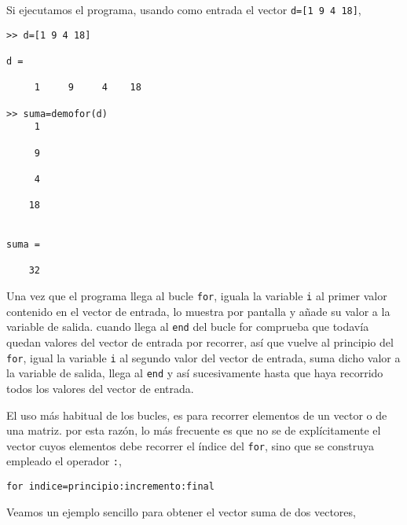 Si ejecutamos el programa, usando como entrada el vector \texttt{d=[1 9 4 18]},

\begin{verbatim}
>> d=[1 9 4 18]

d =

     1     9     4    18

>> suma=demofor(d)
     1

     9

     4

    18


suma =

    32
\end{verbatim}

Una vez que el programa llega al bucle \texttt{for}, iguala la variable \texttt{i} al primer valor contenido en el vector de entrada, lo muestra por pantalla y añade su valor a la variable de salida. cuando llega al \texttt{end} del bucle for comprueba que todavía quedan valores del vector de entrada por recorrer, así que vuelve al principio del \texttt{for}, igual la variable \texttt{i} al segundo valor del vector de entrada, suma dicho valor a la variable de salida, llega al \texttt{end} y así sucesivamente hasta que haya recorrido todos los valores del vector de entrada.

El uso más habitual de los bucles, es para recorrer elementos de un vector o de una matriz. por esta razón, lo más frecuente es que no se de explícitamente el vector cuyos elementos debe recorrer el índice del \texttt{for}, sino que se construya empleado el operador \texttt{:},
\begin{verbatim}
for indice=principio:incremento:final
\end{verbatim}

Veamos un ejemplo sencillo para obtener el vector suma de dos vectores,



